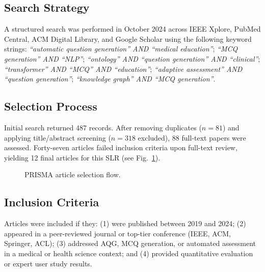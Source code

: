 \documentclass[conference]{IEEEtran}
\begin{document}
\subsection{Search Strategy}
A structured search was performed in October 2024 across IEEE Xplore, PubMed Central, ACM Digital Library, and Google Scholar using the following keyword strings:
\textit{``automatic question generation'' AND ``medical education''};
\textit{``MCQ generation'' AND ``NLP''};
\textit{``ontology'' AND ``question generation'' AND ``clinical''};
\textit{``transformer'' AND ``MCQ'' AND ``education''};
\textit{``adaptive assessment'' AND ``question generation''};
\textit{``knowledge graph'' AND ``MCQ generation''}.

\subsection{Selection Process}
Initial search returned 487 records. After removing duplicates ($n=81$) and applying title/abstract screening ($n=318$ excluded), 88 full-text papers were assessed. Forty-seven articles failed inclusion criteria upon full-text review, yielding 12 final articles for this SLR (see Fig.~\ref{fig:prisma}).

\begin{figure}[htbp]
\centering
{}
\caption{PRISMA article selection flow.}
\label{fig:prisma}
\end{figure}

\subsection{Inclusion Criteria}
Articles were included if they: (1) were published between 2019 and 2024; (2) appeared in a peer-reviewed journal or top-tier conference (IEEE, ACM, Springer, ACL); (3) addressed AQG, MCQ generation, or automated assessment in a medical or health science context; and (4) provided quantitative evaluation or expert user study results.
\end{document}
